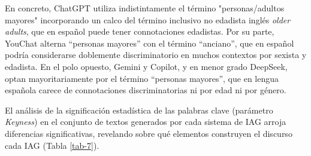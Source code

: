 \documentclass[spanish]{textolivre}
\begin{document}
En concreto, ChatGPT utiliza indistintamente el término "personas/adultos mayores" incorporando un calco del término inclusivo no edadista inglés \textit{older adults}, que en español puede tener connotaciones edadistas. Por su parte, YouChat alterna ``personas mayores'' con el término ``anciano'', que en español podría considerarse doblemente discriminatorio en muchos contextos por sexista y edadista. En el polo opuesto, Gemini y Copilot, y en menor grado DeepSeek, optan mayoritariamente por el término ``personas mayores'', que en lengua española carece de connotaciones discriminatorias ni por edad ni por género.

El análisis de la significación estadística de las palabras clave (parámetro \textit{Keyness}) en el conjunto de textos generados por cada sistema de IAG arroja diferencias significativas, revelando sobre qué elementos construyen el discurso cada IAG (Tabla \ref{tab-7}).
\end{document}
